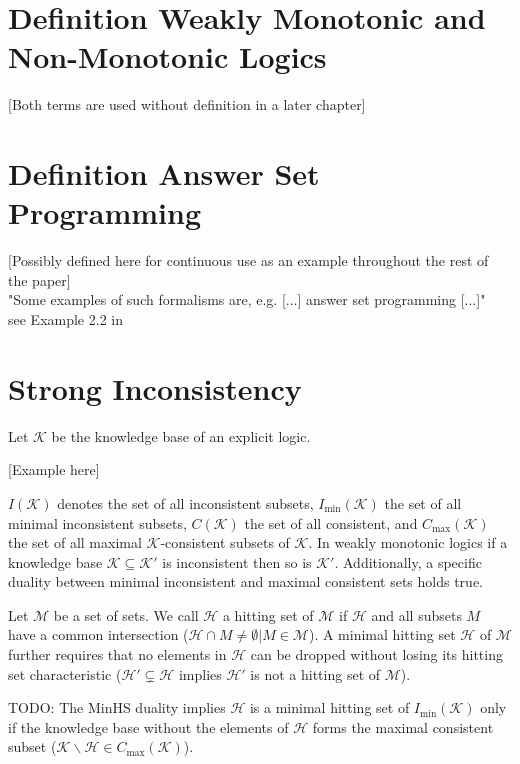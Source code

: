 \section{Definition Weakly Monotonic and Non-Monotonic Logics}
 [Both terms are used without definition in a later chapter]

\section{Definition Answer Set Programming}
 [Possibly defined here for continuous use as an example throughout the rest of the paper]
\\
"Some examples of such formalisms are, e.g. [...] answer set programming \cite{gelfond_logic_2002} [...]"
\\
see Example 2.2 in \cite{ulbricht_measuring_2018}

\section{Strong Inconsistency}
Let \(\mathcal{K}\) be the knowledge base of an explicit logic.

    [Example here]

\(I(\mathcal{K})\) denotes the set of all inconsistent subsets, \(I_{\min}(\mathcal{K})\) the set of all minimal inconsistent subsets, \(C(\mathcal{K})\) the set of all consistent, and \(C_{\max}(\mathcal{K})\) the set of all maximal \(\mathcal{K}\)-consistent subsets of \(\mathcal{K}\). In weakly monotonic logics if a knowledge base \(\mathcal{K} \subseteq \mathcal{K}'\) is inconsistent then so is \(\mathcal{K}'\). Additionally, a specific duality between minimal inconsistent and maximal consistent sets holds true.

Let \(\mathcal{M}\) be a set of sets. We call \(\mathcal{H}\) a hitting set of \(\mathcal{M}\) if \(\mathcal{H}\) and all subsets \(M\) have a common intersection (\(\mathcal{H} \cap M \neq \emptyset | M \in \mathcal{M}\)). A minimal hitting set \(\mathcal{H}\) of \(\mathcal{M}\) further requires that no elements in \(\mathcal{H}\) can be dropped without losing its hitting set characteristic (\(\mathcal{H}' \subsetneq \mathcal{H}\) implies \(\mathcal{H}'\) is not a hitting set of \(\mathcal{M}\)).

\begin{theorem}
    TODO:
    The MinHS duality \cite{reiter_theory_1987} implies \(\mathcal{H}\) is a minimal hitting set of \(I_{\min}(\mathcal{K})\) only if the knowledge base without the elements of \(\mathcal{H}\) forms the maximal consistent subset (\(\mathcal{K} \backslash \mathcal{H} \in C_{\max}(\mathcal{K})\)).
\end{theorem}

